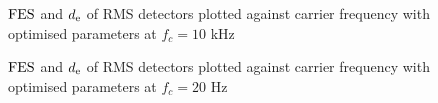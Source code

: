 \documentclass[../main2.tex]{subfiles}
\providecommand{\rootdir}{..}
\begin{document}
\begin{figure}[h]
\captionsetup{justification=centering}
\begin{subfigure}{\linewidth}
\centerline{}
\end{subfigure}
\par\bigskip
\begin{subfigure}{\linewidth}
\centerline{}
\end{subfigure}
\caption{$\text{FES}$ and $d_\text{e}$ of RMS detectors plotted against carrier frequency with optimised parameters at $f_c=10$ kHz}
\label{fig:rms_det_opt_env_fc10000_dep_error-fes}
\end{figure}
\begin{figure}[h]
\captionsetup{justification=centering}
\begin{subfigure}{\linewidth}
\centerline{}
\end{subfigure}
\par\bigskip
\begin{subfigure}{\linewidth}
\centerline{}
\end{subfigure}
\caption{$\text{FES}$ and $d_\text{e}$ of RMS detectors plotted against carrier frequency with optimised parameters at $f_c=20$ Hz}
\label{fig:rms_det_opt_env_fc10000_dep_error-fes}
\end{figure}
\end{document}
